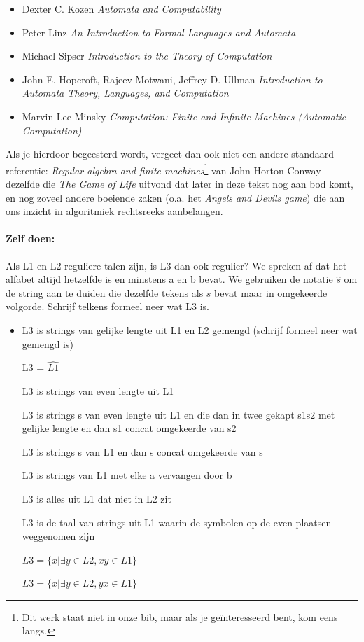 \begin{itemize}
\item 
Dexter C. Kozen  {\em Automata and Computability} 

\item 
Peter Linz {\em An Introduction to Formal Languages and Automata}

\item 
Michael Sipser {\em Introduction to the Theory of Computation}

\item
John E. Hopcroft, Rajeev Motwani, Jeffrey D. Ullman
{\em Introduction to Automata Theory, Languages, and Computation}

\item
Marvin Lee Minsky {\em Computation: Finite and Infinite Machines
(Automatic Computation)}
\end{itemize}


Als je hierdoor begeesterd wordt, vergeet dan ook niet een andere
standaard referentie: {\em Regular algebra and finite
machines}\footnote{Dit werk staat niet in onze bib, maar als je
ge\"{i}nteresseerd bent, kom eens langs.} van John Horton Conway -
dezelfde die {\em The Game of Life} uitvond dat later in deze tekst
nog aan bod komt, en nog zoveel andere boeiende zaken (o.a. het {\em
Angels and Devils game}) die aan ons inzicht in algoritmiek
rechtsreeks aanbelangen.

\clearpage

\paragraph{Zelf doen:}

Als L1 en L2 reguliere talen zijn, is L3 dan ook regulier?
We spreken af dat het alfabet altijd hetzelfde is en minstens a en b
bevat. We gebruiken de notatie $\hat{s}$ om de string aan te duiden
die dezelfde tekens als $s$ bevat maar in omgekeerde volgorde. Schrijf
telkens formeel neer wat L3 is.
\begin{itemize}
\item[]
L3 is strings van gelijke lengte uit L1 en L2 gemengd (schrijf formeel neer wat gemengd is)

L3 = $\widehat{L1}$

L3 is strings van even lengte uit L1

L3 is strings s van even lengte uit L1 en die dan in twee gekapt s1s2
met gelijke lengte en dan s1 concat omgekeerde van s2

L3 is strings s van L1 en dan s concat omgekeerde van s

L3 is strings van L1 met elke a vervangen door b

L3 is alles uit L1 dat niet in L2 zit

L3 is de taal van strings uit L1 waarin de symbolen op de even
plaatsen weggenomen zijn

$L3 = \{x|\exists y \in L2, xy \in L1\}$

$L3 = \{x|\exists y \in L2, yx \in L1\}$

\end{itemize}


